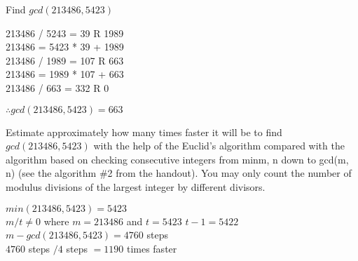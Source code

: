 \documentclass[12pt,largemargins]{homework}
\date{Septemeber 6, 2018}
\begin{document}
\maketitle


\question
  \begin{alphaparts}

  \item
    Find $gcd(213486, 5423)$

    \begin{linenumbers}
      213486 / 5243 = 39 R 1989 \\
      213486 = 5423 * 39 + 1989 \\
      213486 / 1989 = 107 R 663 \\
      213486 = 1989 * 107 + 663 \\
      213486 / 663 = 332 R 0 

    \end{linenumbers}

    $\therefore gcd(213486,5423) = 663 $


  \item
    Estimate approximately how many times faster it will be to find 
    $gcd(213486, 5423)$ with the help of the Euclid’s algorithm compared with the algorithm based on checking consecutive integers from min{m, n} down to gcd(m, n) (see the algorithm \#2 from the handout). You may only count the number of modulus divisions of the largest integer by different divisors.


    \begin{linenumbers}
      $min(213486,5423) = 5423$ \\
      $m/t \neq 0 $ where $m=213486$ and $ t=5423 $
      $t-1 = 5422 $ \\
      $m-gcd(213486, 5423) = 4760$ steps \\
      $4760$ steps $/4$ steps $=1190$ times faster 
    \end{linenumbers}

\end{alphaparts}
\end{document}
